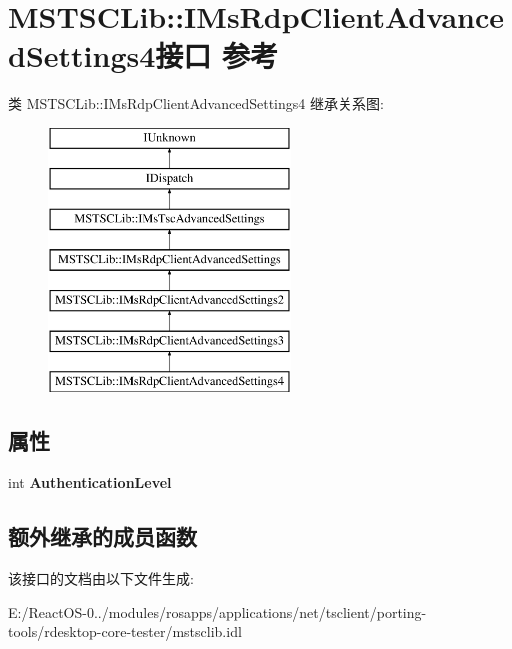 \hypertarget{interface_m_s_t_s_c_lib_1_1_i_ms_rdp_client_advanced_settings4}{}\section{M\+S\+T\+S\+C\+Lib\+:\+:I\+Ms\+Rdp\+Client\+Advanced\+Settings4接口 参考}
\label{interface_m_s_t_s_c_lib_1_1_i_ms_rdp_client_advanced_settings4}
类 M\+S\+T\+S\+C\+Lib\+:\+:I\+Ms\+Rdp\+Client\+Advanced\+Settings4 继承关系图\+:\begin{figure}[H]
\begin{center}
\leavevmode
\includegraphics[height=7.000000cm]{interface_m_s_t_s_c_lib_1_1_i_ms_rdp_client_advanced_settings4}
\end{center}
\end{figure}
\subsection*{属性}
\begin{DoxyCompactItemize}
\item 
\mbox{\label{interface_m_s_t_s_c_lib_1_1_i_ms_rdp_client_advanced_settings4_a01ba3945a4358173af03cf95fe1811c5}} 
int {\bfseries Authentication\+Level}
\end{DoxyCompactItemize}
\subsection*{额外继承的成员函数}


该接口的文档由以下文件生成\+:\begin{DoxyCompactItemize}
\item 
E\+:/\+React\+O\+S-\/0../modules/rosapps/applications/net/tsclient/porting-\/tools/rdesktop-\/core-\/tester/mstsclib.\+idl\end{DoxyCompactItemize}
